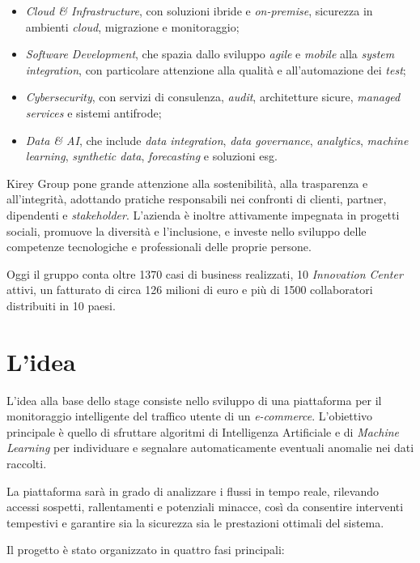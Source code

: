 \begin{itemize}
    \item \emph{Cloud \& Infrastructure}, con soluzioni ibride e \emph{on-premise}, sicurezza in ambienti \emph{cloud}, migrazione e monitoraggio;
    \item \emph{Software Development}, che spazia dallo sviluppo \emph{agile} e \emph{mobile} alla \emph{system integration}, con particolare attenzione alla qualità e all'automazione dei \emph{test};
    \item \emph{Cybersecurity}, con servizi di consulenza, \emph{audit}, architetture sicure, \emph{managed services} e sistemi antifrode;
    \item \emph{Data \& AI}, che include \emph{data integration}, \emph{data governance}, \emph{analytics}, \emph{machine learning}, \emph{synthetic data}, \emph{forecasting} e soluzioni \gls{esg}\glsfirstoccur.
\end{itemize}

Kirey Group pone grande attenzione alla sostenibilità, alla trasparenza e all'integrità, adottando pratiche responsabili nei confronti di clienti, partner, dipendenti e \emph{stakeholder}. 
L'azienda è inoltre attivamente impegnata in progetti sociali, promuove la diversità e l'inclusione, e investe nello sviluppo delle competenze tecnologiche e professionali delle proprie persone.

Oggi il gruppo conta oltre 1370 casi di business realizzati, 10 \emph{Innovation Center} attivi, un fatturato di circa 126 milioni di euro e più di 1500 collaboratori distribuiti in 10 paesi.


\section{L'idea}

L'idea alla base dello stage consiste nello sviluppo di una piattaforma per il monitoraggio intelligente del traffico utente di un \emph{e-commerce}. L'obiettivo principale è quello di sfruttare algoritmi di Intelligenza Artificiale e di \emph{Machine Learning} per individuare e segnalare automaticamente eventuali anomalie nei dati raccolti.

La piattaforma sarà in grado di analizzare i flussi in tempo reale, rilevando accessi sospetti, rallentamenti e potenziali minacce, così da consentire interventi tempestivi e garantire sia la sicurezza sia le prestazioni ottimali del sistema.

Il progetto è stato organizzato in quattro fasi principali:

